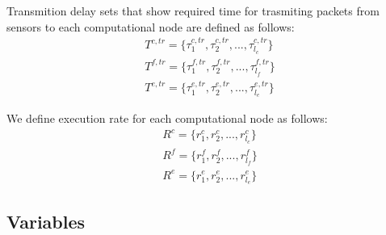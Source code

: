 \documentclass[conference]{IEEEtran}
\begin{document}
    Transmition delay sets that show required time for trasmiting packets
    from sensors to each computational node are defined as follows:
    \begin{subequations}
      \begin{align}
        T^{c,tr} = \{\tau_1^{c,tr}, \tau_2^{c,tr}, ..., \tau_{l_c}^{c,tr}\}\\
        T^{f,tr} = \{\tau_1^{f,tr}, \tau_2^{f,tr}, ..., \tau_{l_f}^{f,tr}\}\\
        T^{e,tr} = \{\tau_1^{e,tr}, \tau_2^{e,tr}, ..., \tau_{l_e}^{e,tr}\}
      \end{align}
    \end{subequations}

    We define execution rate for each computational node as follows:
    \begin{subequations}
      \begin{align}
        R^c = \{r_1^c, r_2^c, ..., r_{l_c}^c\}\\
        R^f = \{r_1^f, r_2^f, ..., r_{l_f}^f\}\\
        R^e = \{r_1^e, r_2^e, ..., r_{l_e}^e\}
      \end{align}
    \end{subequations}

    \subsection{Variables}
\end{document}

